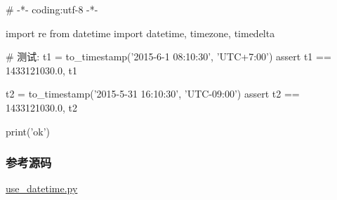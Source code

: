 \begin{pythoncode}
# -*- coding:utf-8 -*-

import re
from datetime import datetime, timezone, timedelta
\end{pythoncode}

\begin{pythoncode}
# 测试:
t1 = to_timestamp('2015-6-1 08:10:30', 'UTC+7:00')
assert t1 == 1433121030.0, t1

t2 = to_timestamp('2015-5-31 16:10:30', 'UTC-09:00')
assert t2 == 1433121030.0, t2

print('ok')
\end{pythoncode}

\hypertarget{ux53c2ux8003ux6e90ux7801}{%
\subsubsection{参考源码}\label{ux53c2ux8003ux6e90ux7801}}

\href{https://github.com/michaelliao/learn-python3/blob/master/samples/commonlib/use_datetime.py}{use\_datetime.py}

